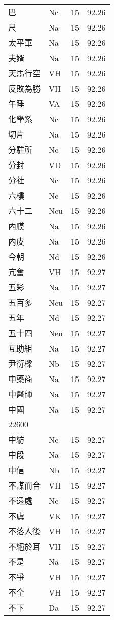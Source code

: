 \documentclass[twocolumn]{book}
\begin{document}
\begin{supertabular}{llrr}
巴 & Nc & 15 &  92.26\\
尺 & Na & 15 &  92.26\\
太平軍 & Na & 15 &  92.26\\
夫婿 & Na & 15 &  92.26\\
天馬行空 & VH & 15 &  92.26\\
反敗為勝 & VH & 15 &  92.26\\
午睡 & VA & 15 &  92.26\\
化學系 & Nc & 15 &  92.26\\
切片 & Na & 15 &  92.26\\
分駐所 & Nc & 15 &  92.26\\
分封 & VD & 15 &  92.26\\
分社 & Nc & 15 &  92.26\\
六樓 & Nc & 15 &  92.26\\
六十二 & Neu & 15 &  92.26\\
內膜 & Na & 15 &  92.26\\
內皮 & Na & 15 &  92.26\\
今朝 & Nd & 15 &  92.26\\
亢奮 & VH & 15 &  92.27\\
五彩 & Na & 15 &  92.27\\
五百多 & Neu & 15 &  92.27\\
五年 & Nd & 15 &  92.27\\
五十四 & Neu & 15 &  92.27\\
互助組 & Na & 15 &  92.27\\
尹衍樑 & Nb & 15 &  92.27\\
中藥商 & Na & 15 &  92.27\\
中醫師 & Na & 15 &  92.27\\
中國 & Na & 15 &  92.27\\
22600\\
中紡 & Nc & 15 &  92.27\\
中段 & Na & 15 &  92.27\\
中信 & Nb & 15 &  92.27\\
不謀而合 & VH & 15 &  92.27\\
不遠處 & Nc & 15 &  92.27\\
不虞 & VK & 15 &  92.27\\
不落人後 & VH & 15 &  92.27\\
不絕於耳 & VH & 15 &  92.27\\
不是 & Na & 15 &  92.27\\
不爭 & VH & 15 &  92.27\\
不全 & VH & 15 &  92.27\\
不下 & Da & 15 &  92.27\\

\end{supertabular}
\end{document}

